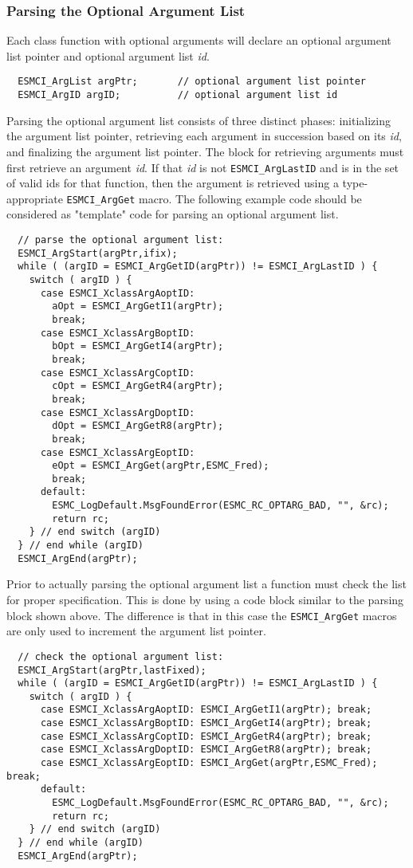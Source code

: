 \subsubsection{Parsing the Optional Argument List}

Each class function with optional arguments will declare an optional argument
list pointer and optional argument list \textit{id}.
\begin{verbatim}
  ESMCI_ArgList argPtr;       // optional argument list pointer
  ESMCI_ArgID argID;          // optional argument list id
\end{verbatim}

\noindent
Parsing the optional argument list consists of three distinct phases: initializing
the argument list pointer, retrieving each argument in succession based on its
\textit{id}, and finalizing the argument list pointer. The block for retrieving
arguments must first retrieve an argument \textit{id}. If that \textit{id} is
not \texttt{ESMCI\_ArgLastID} and is in the set of valid ids for that function,
then the argument is retrieved using a type-appropriate \texttt{ESMCI\_ArgGet}
macro. The following example code should be considered as "template" code for
parsing an optional argument list.
\begin{verbatim}
  // parse the optional argument list:
  ESMCI_ArgStart(argPtr,ifix);
  while ( (argID = ESMCI_ArgGetID(argPtr)) != ESMCI_ArgLastID ) {
    switch ( argID ) {
      case ESMCI_XclassArgAoptID:
        aOpt = ESMCI_ArgGetI1(argPtr);
        break;
      case ESMCI_XclassArgBoptID:
        bOpt = ESMCI_ArgGetI4(argPtr);
        break;
      case ESMCI_XclassArgCoptID:
        cOpt = ESMCI_ArgGetR4(argPtr);
        break;
      case ESMCI_XclassArgDoptID:
        dOpt = ESMCI_ArgGetR8(argPtr);
        break;
      case ESMCI_XclassArgEoptID:
        eOpt = ESMCI_ArgGet(argPtr,ESMC_Fred);
        break;
      default:
        ESMC_LogDefault.MsgFoundError(ESMC_RC_OPTARG_BAD, "", &rc);
        return rc;
    } // end switch (argID)
  } // end while (argID)
  ESMCI_ArgEnd(argPtr);
\end{verbatim}

\noindent
Prior to actually parsing the optional argument list a function must check the
list for proper specification. This is done by using a code block similar to the
parsing block shown above. The difference is that in this case the
\texttt{ESMCI\_ArgGet} macros are only used to increment the argument list pointer.
\begin{verbatim}
  // check the optional argument list:
  ESMCI_ArgStart(argPtr,lastFixed);
  while ( (argID = ESMCI_ArgGetID(argPtr)) != ESMCI_ArgLastID ) {
    switch ( argID ) {
      case ESMCI_XclassArgAoptID: ESMCI_ArgGetI1(argPtr); break;
      case ESMCI_XclassArgBoptID: ESMCI_ArgGetI4(argPtr); break;
      case ESMCI_XclassArgCoptID: ESMCI_ArgGetR4(argPtr); break;
      case ESMCI_XclassArgDoptID: ESMCI_ArgGetR8(argPtr); break;
      case ESMCI_XclassArgEoptID: ESMCI_ArgGet(argPtr,ESMC_Fred); break;
      default:
        ESMC_LogDefault.MsgFoundError(ESMC_RC_OPTARG_BAD, "", &rc);
        return rc;
    } // end switch (argID)
  } // end while (argID)
  ESMCI_ArgEnd(argPtr);
\end{verbatim}

